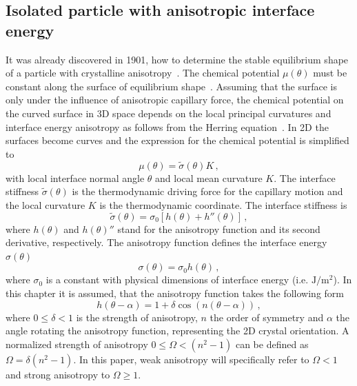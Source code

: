 	\subsection{Isolated particle with anisotropic interface energy} \label{sec_isol_aniso_particle}
	It was already discovered in 1901, how to determine the stable equilibrium shape of a particle with crystalline anisotropy~\cite{Wulff1901}. The chemical potential $\mu(\theta)$ must be constant along the surface of equilibrium shape~\cite{Bao2017}. Assuming that the surface is only under the influence of anisotropic capillary force, the chemical potential on the curved surface in 3D space depends on the local principal curvatures and interface energy anisotropy as follows from the Herring equation~\cite{Herring1951, Johnson1965}. In 2D the surfaces become curves and the expression for the chemical potential is simplified to
	\begin{equation}\label{eq_chempot_constant}
		\mu(\theta) = \tilde{\sigma}(\theta)K \,,
	\end{equation}
	with local interface normal angle $\theta$ and local mean curvature $K$. The interface stiffness $\tilde{\sigma}(\theta)$ is the thermodynamic driving force for the capillary motion and the local curvature $K$ is the thermodynamic coordinate. The interface stiffness is 
	\begin{equation} \label{eq_def_interface_siffness}
		\tilde{\sigma}(\theta)=\sigma_0[h(\theta)+h''(\theta)] \,,
	\end{equation}
	where $h(\theta)$ and $h(\theta)''$ stand for the anisotropy function and its second derivative, respectively. The anisotropy function defines the interface energy $\sigma(\theta)$
	\begin{equation} \label{eq_anisoIE}
		\sigma(\theta) = \sigma_0  h(\theta) \,,
	\end{equation}
	where $\sigma_0$ is a constant with physical dimensions of interface energy (i.e. $\mathrm{J/m^2}$). In this chapter it is assumed, that the anisotropy function takes the following form 
	\begin{equation} \label{eq_anisofun}
		h(\theta -\alpha) = 1+\delta\cos(n(\theta-\alpha)) \,,
	\end{equation}
	where $0\leq\delta<1$ is the strength of anisotropy, $n$ the order of symmetry and $\alpha$ the angle rotating the anisotropy function, representing the 2D crystal orientation. A normalized strength of anisotropy $0\leq \Omega < (n^2-1)$ can be defined as $\Omega=\delta(n^2-1)$. In this paper, weak anisotropy will specifically refer to $\Omega<1$ and strong anisotropy to $\Omega\geq1$.
	
